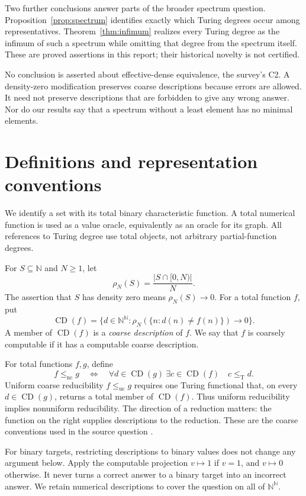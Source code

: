 \documentclass[11pt,a4paper]{article}
\newcommand{\N}{\mathbb N}
\newcommand{\Baire}{\N^{\N}}
\newcommand{\leT}{\leq_{\mathrm T}}
\newcommand{\CD}{\operatorname{CD}}
\newcommand{\nc}{\mathrm{nc}}
\newcommand{\uc}{\mathrm{uc}}
\theoremstyle{definition}
\theoremstyle{remark}
\begin{document}
Two further conclusions answer parts of the broader spectrum question. Proposition~\ref{prop:spectrum} identifies exactly which Turing degrees occur among representatives. Theorem~\ref{thm:infimum} realizes every Turing degree as the infimum of such a spectrum while omitting that degree from the spectrum itself. These are proved assertions in this report; their historical novelty is not certified.

No conclusion is asserted about effective-dense equivalence, the survey's C2. A density-zero modification preserves coarse descriptions because errors are allowed. It need not preserve descriptions that are forbidden to give any wrong answer. Nor do our results say that a spectrum without a least element has no minimal elements.

\section{Definitions and representation conventions}\label{sec:definitions}
We identify a set with its total binary characteristic function. A total numerical function is used as a value oracle, equivalently as an oracle for its graph. All references to Turing degree use total objects, not arbitrary partial-function degrees.

For $S\subseteq\N$ and $N\geq1$, let
\[
\rho_N(S)=\frac{|S\cap[0,N)|}{N}.
\]
The assertion that $S$ has density zero means $\rho_N(S)\to0$. For a total function $f$, put
\[
\CD(f)=\{d\in\Baire:\rho_N(\{n:d(n)\ne f(n)\})\longrightarrow0\}.
\]
A member of $\CD(f)$ is a \emph{coarse description} of $f$. We say that $f$ is coarsely computable if it has a computable coarse description.

For total functions $f,g$, define
\[
f\leq_{\nc}g
\quad\Longleftrightarrow\quad
\forall d\in\CD(g)\ \exists c\in\CD(f)\quad c\leT d.
\]
Uniform coarse reducibility $f\leq_{\uc}g$ requires one Turing functional that, on every $d\in\CD(g)$, returns a total member of $\CD(f)$. Thus uniform reducibility implies nonuniform reducibility. The direction of a reduction matters: the function on the right supplies descriptions to the reduction. These are the coarse conventions used in the source question \cite{Gerdes}.

For binary targets, restricting descriptions to binary values does not change any argument below. Apply the computable projection $v\mapsto 1$ if $v=1$, and $v\mapsto0$ otherwise. It never turns a correct answer to a binary target into an incorrect answer. We retain numerical descriptions to cover the question on all of $\Baire$.
\end{document}
